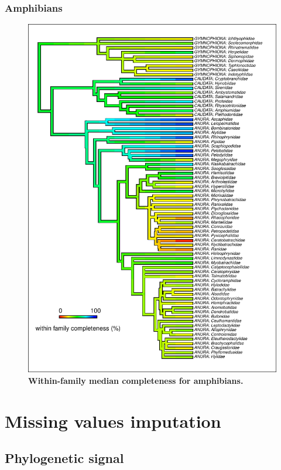 \documentclass[11pt]{article}
\begin{document}
\subsubsection{Amphibians}
\begin{figure}[h!]
\centering
\includegraphics[scale=1.2]{figures/NA_phylo_patterns/Amphibians_completeness}
\caption[Within-family median completeness for amphibians]{\textbf{Within-family median completeness for amphibians.}}
\label{compPREDICTS}
\end{figure}

\pagebreak
\section{Missing values imputation}

\subsection{Phylogenetic signal}
\end{document}

